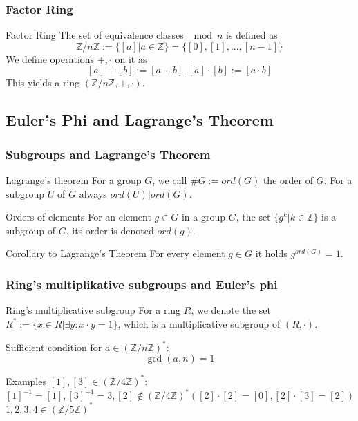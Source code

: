 \documentclass{beamer}
\begin{document}
\begin{frame}
\frametitle{Factor Ring}
\begin{block}{Factor Ring}
The set of equivalence classes $\mod n$ is defined as \[\mathbb{Z}/n\mathbb{Z}:=\{[a]|a\in\mathbb{Z}\}=\{[0],[1],...,[n-1]\}\] \pause We define operations $+,\cdot$ on it as \[[a]+[b]:=[a+b],[a]\cdot [b]:=[a\cdot b]\] This yields a ring $(\mathbb{Z}/n\mathbb{Z},+,\cdot)$.
\end{block}
\end{frame}
\subsection{Euler's Phi and Lagrange's Theorem}
\begin{frame}
\frametitle{Subgroups and Lagrange's Theorem}

\begin{block}{Lagrange's theorem}
For a group $G$, we call $\#G:=ord(G)$ the order of $G$. For a subgroup $U$ of $G$ always $ord(U)|ord(G)$.
\end{block}\pause

\begin{block}{Orders of elements}
For an element $g\in G$ in a group $G$, the set $\{g^k|k\in\mathbb{Z}\}$ is a subgroup of $G$, its order is denoted $ord(g)$.
\end{block}
\pause
\begin{block}{Corollary to Lagrange's Theorem}
For every element $g\in G$ it holds $g^{ord(G)}=1$.
\end{block}
\end{frame}

\begin{frame}
\frametitle{Ring's multiplikative subgroups and Euler's phi}
\begin{block}{Ring's multiplicative subgroup}
For a ring $R$, we denote the set $R^*:=\{x\in R|\exists y:x\cdot y=1\}$, which is a multiplicative subgroup of $(R,\cdot)$.
\end{block}
\pause
Sufficient condition for $a\in\left(\mathbb{Z}/n\mathbb{Z}\right)^*:$
\[\gcd(a,n)=1\]
\pause
\begin{block}{Examples}
$[1],[3]\in\left(\mathbb{Z}/4\mathbb{Z}\right)^*$: $[1]^{-1}=[1], [3]^{-1}=3, [2]\notin\left(\mathbb{Z}/4\mathbb{Z}\right)^* ([2]\cdot [2]=[0],[2]\cdot [3]=[2])$\\
$1,2,3,4\in\left(\mathbb{Z}/5\mathbb{Z}\right)^*$ 
\end{block}


\end{frame}
\end{document}
